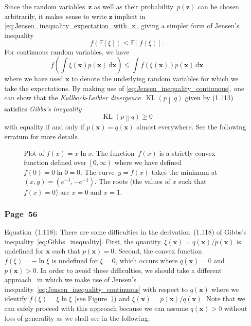 \documentclass[12pt,a4paper]{article}
\newcommand{\erratum}[1]{%
\subsubsection*{#1}
\addcontentsline{toc}{subsection}{#1}}
\begin{document}
Since the random variables~$\mathbf{z}$ as well as their probability~$p(\mathbf{z})$ can be chosen
arbitrarily,
it makes sense to write $\mathbf{z}$ implicit in \eqref{eq:Jensen_inequality_expectation_with_z},
giving a simpler form of Jensen's inequality
\begin{equation}
f\left(\mathbb{E}\left[\xi\right]\right)
\leqslant \mathbb{E}\left[f\left(\xi\right)\right] .
\end{equation}
For continuous random variables, we have
\begin{equation}
f\left(\int\xi(\mathbf{x}) p(\mathbf{x}) \,\mathrm{d}\mathbf{x}\right) \leqslant 
\int f\left(\xi(\mathbf{x})\right) p(\mathbf{x}) \,\mathrm{d}\mathbf{x}
\label{eq:Jensen_inequality_continuous}
\end{equation}
where we have used $\mathbf{x}$ to denote the underlying random variables
for which we take the expectations.
By making use of \eqref{eq:Jensen_inequality_continuous},
one can show that
the \emph{Kullback-Leibler divergence}~$\operatorname{KL}\left( p \middle\| q \right)$
given by (1.113) satisfies \emph{Gibbs's inequality}
\begin{equation}
\operatorname{KL}\left( p \middle\| q \right) \geqslant 0
\label{eq:Gibbs_inequality}
\end{equation}
with equality if and only if $p(\mathbf{x}) = q(\mathbf{x})$ almost everywhere.
See the following erratum for more details.

\begin{figure}
\centering

\caption{Plot of $f(x) = x \ln x$.
The function~$f(x)$ is a strictly convex function defined over $\left[0, \infty\right)$
where we have defined $f(0) = 0 \ln 0 = 0$.
The curve~$y = f(x)$ takes the minimum at $(x, y) = \left(e^{-1}, -e^{-1}\right)$.
The roots (the values of $x$ such that $f(x) = 0$) are $x = 0$ and $x = 1$.}
\label{fig:x_ln_x}
\end{figure}

\erratum{Page~56}
Equation~(1.118):
There are some difficulties in the derivation~(1.118) of
Gibbs's inequality~\eqref{eq:Gibbs_inequality}.
First, the quantity~$\xi(\mathbf{x}) = q(\mathbf{x})/p(\mathbf{x})$ is undefined for $\mathbf{x}$
such that $p(\mathbf{x}) = 0$.
Second, the convex function~$f(\xi) = -\ln\xi$ is undefined for $\xi = 0$,
which occurs where $q(\mathbf{x}) = 0$ and $p(\mathbf{x}) > 0$.
In order to avoid these difficulties,
we should take a different approach~\citep{MacKay:Information,KullbackLeibler:Information}
in which we make use of Jensen's inequality~\eqref{eq:Jensen_inequality_continuous}
with respect to $q(\mathbf{x})$ where
we identify $f(\xi) = \xi\ln\xi$ (see Figure~\ref{fig:x_ln_x}) and
$\xi(\mathbf{x}) = p(\mathbf{x})/q(\mathbf{x})$.
Note that we can safely proceed with this approach
because we can assume $q(\mathbf{x}) > 0$
without loss of generality as we shall see in the following.
\end{document}
